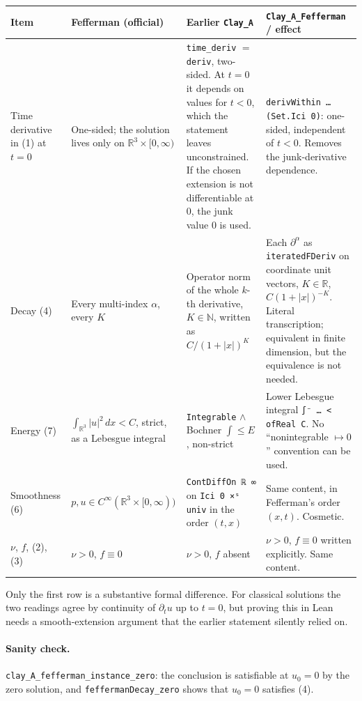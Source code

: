 \documentclass[11pt,a4paper]{article}
\theoremstyle{definition}
\theoremstyle{remark}
\newcommand{\R}{\mathbb{R}}
\newcommand{\lean}[1]{\texttt{#1}}
\begin{document}
\begin{center}
\small
\begin{tabularx}{\linewidth}{@{}>{\raggedright\arraybackslash}p{2.2cm}>{\raggedright\arraybackslash}X>{\raggedright\arraybackslash}X>{\raggedright\arraybackslash}X@{}}
\toprule
Item & Fefferman (official) & Earlier \lean{Clay\_A} & \lean{Clay\_A\_Fefferman} / effect \\
\midrule
Time derivative in (1) at $t=0$ & One-sided; the solution lives only on $\R^3\times[0,\infty)$ & \lean{time\_deriv} $=$ \lean{deriv}, two-sided. At $t=0$ it depends on values for $t<0$, which the statement leaves unconstrained. If the chosen extension is not differentiable at $0$, the junk value $0$ is used. & \lean{derivWithin … (Set.Ici 0)}: one-sided, independent of $t<0$. Removes the junk-derivative dependence. \\
\addlinespace
Decay (4) & Every multi-index $\alpha$, every $K$ & Operator norm of the whole $k$-th derivative, $K\in\mathbb{N}$, written as $C/(1+|x|)^K$ & Each $\partial^\alpha$ as \lean{iteratedFDeriv} on coordinate unit vectors, $K\in\R$, $C(1+|x|)^{-K}$. Literal transcription; equivalent in finite dimension, but the equivalence is not needed. \\
\addlinespace
Energy (7) & $\int_{\R^3}|u|^2\,dx<C$, strict, as a Lebesgue integral & \lean{Integrable} $\wedge$ Bochner $\int\le E$, non-strict & Lower Lebesgue integral \lean{∫⁻ … < ofReal C}. No ``nonintegrable $\mapsto 0$'' convention can be used. \\
\addlinespace
Smoothness (6) & $p,u\in C^\infty(\R^3\times[0,\infty))$ & \lean{ContDiffOn ℝ ∞} on \lean{Ici 0 ×ˢ univ} in the order $(t,x)$ & Same content, in Fefferman's order $(x,t)$. Cosmetic. \\
\addlinespace
$\nu$, $f$, (2), (3) & $\nu>0$, $f\equiv0$ & $\nu>0$, $f$ absent & $\nu>0$, $f\equiv0$ written explicitly. Same content. \\
\bottomrule
\end{tabularx}
\end{center}

\noindent Only the first row is a substantive formal difference. For classical solutions the two readings agree by continuity of $\partial_tu$ up to $t=0$, but proving this in Lean needs a smooth-extension argument that the earlier statement silently relied on.

\paragraph{Sanity check.} \lean{clay\_A\_fefferman\_instance\_zero}: the conclusion is satisfiable at $u_0=0$ by the zero solution, and \lean{feffermanDecay\_zero} shows that $u_0=0$ satisfies (4).
\end{document}
